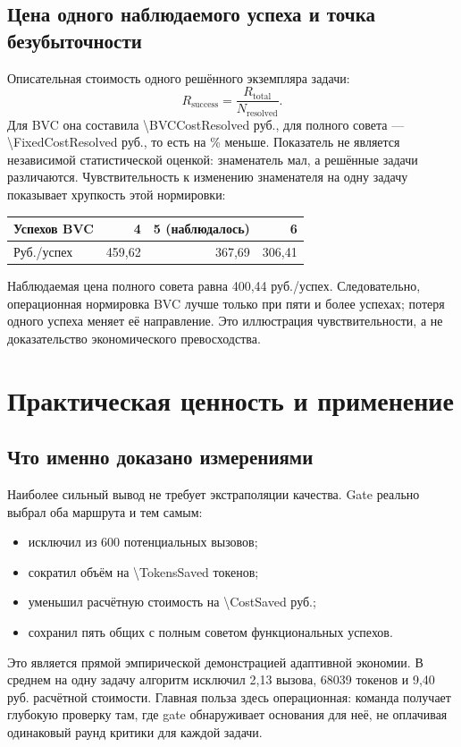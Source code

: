 \documentclass[11pt]{article}
\begin{document}
\subsection{Цена одного наблюдаемого успеха и точка безубыточности}

Описательная стоимость одного решённого экземпляра задачи:
\[
R_{\mathrm{success}}=\frac{R_{\mathrm{total}}}{N_{\mathrm{resolved}}}.
\]
Для BVC она составила \num{\BVCCostResolved} руб., для полного совета ---
\num{\FixedCostResolved} руб., то есть на \CostResolvedSavedPct\% меньше.
Показатель не является независимой статистической оценкой: знаменатель мал,
а решённые задачи различаются. Чувствительность к изменению знаменателя на
одну задачу показывает хрупкость этой нормировки:

\begin{center}
\begin{tabular}{@{}lrrr@{}}
\toprule
Успехов BVC & 4 & 5 (наблюдалось) & 6\\
\midrule
Руб./успех & 459,62 & 367,69 & 306,41\\
\bottomrule
\end{tabular}
\end{center}

Наблюдаемая цена полного совета равна 400,44 руб./успех. Следовательно,
операционная нормировка BVC лучше только при пяти и более успехах; потеря
одного успеха меняет её направление. Это иллюстрация чувствительности, а не
доказательство экономического превосходства.

\section{Практическая ценность и применение}

\subsection{Что именно доказано измерениями}

Наиболее сильный вывод не требует экстраполяции качества. Gate реально
выбрал оба маршрута и тем самым:
\begin{itemize}
  \item исключил \CallsSaved{} из 600 потенциальных вызовов;
  \item сократил объём на \num{\TokensSaved} токенов;
  \item уменьшил расчётную стоимость на \num{\CostSaved} руб.;
  \item сохранил пять общих с полным советом функциональных успехов.
\end{itemize}
Это является прямой эмпирической демонстрацией адаптивной экономии. В среднем
на одну задачу алгоритм исключил 2,13 вызова, \num{68039} токенов и 9,40 руб.
расчётной стоимости. Главная польза здесь операционная: команда получает
глубокую проверку там, где gate обнаруживает основания для неё, не оплачивая
одинаковый раунд критики для каждой задачи.
\end{document}
